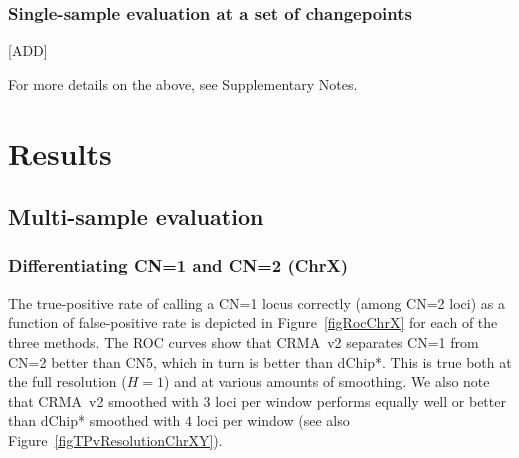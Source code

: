 \documentclass{bioinfo}
\newcommand{\TPrate}{true-positive rate\xspace}
\newcommand{\FPrate}{false-positive rate\xspace}
\begin{document}
\subsubsection{Single-sample evaluation at a set of changepoints}
[ADD]

For more details on the above, see Supplementary Notes.


 
\section{Results}
\label{secResults}

\subsection{Multi-sample evaluation}

\subsubsection{Differentiating CN=1 and CN=2 (ChrX)}
The \TPrate of calling a CN=1 locus correctly (among CN=2 loci) as a function of \FPrate is depicted in Figure~\ref{figRocChrX} for each of the three methods.
The ROC curves show that CRMA~v2 separates CN=1 from CN=2 better than CN5, which in turn is better than dChip*.  This is true both at the full resolution ($H=1$) and at various amounts of smoothing.  
We also note that CRMA~v2 smoothed with $3$ loci per window performs equally well or better than dChip* smoothed with $4$ loci per window (see also Figure~\ref{figTPvResolutionChrXY}).
\end{document}
